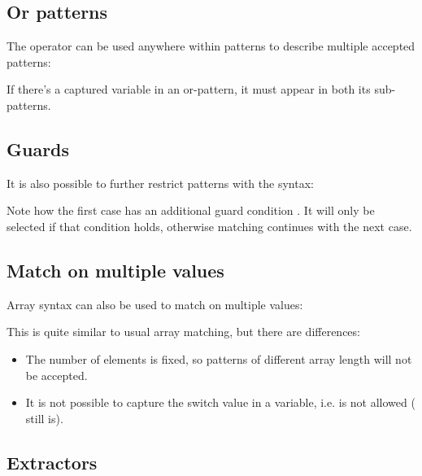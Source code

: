 \documentclass{haxe}
\begin{document}
\subsection{Or patterns}
\label{lf-pattern-matching-or}

The \expr{|} operator can be used anywhere within patterns to describe multiple accepted patterns:


If there's a captured variable in an or-pattern, it must appear in both its sub-patterns.

\subsection{Guards}
\label{lf-pattern-matching-guards}

It is also possible to further restrict patterns with the  syntax:


Note how the first case has an additional guard condition . It will only be selected if that condition holds, otherwise matching continues with the next case.

\subsection{Match on multiple values}
\label{lf-pattern-matching-tuples}

Array syntax can also be used to match on multiple values:


This is quite similar to usual array matching, but there are differences:

\begin{itemize}
	\item The number of elements is fixed, so patterns of different array length will not be accepted.
	\item It is not possible to capture the switch value in a variable, i.e.  is not allowed ( still is).
\end{itemize}




\subsection{Extractors}
\label{lf-pattern-matching-extractors}
\end{document}
